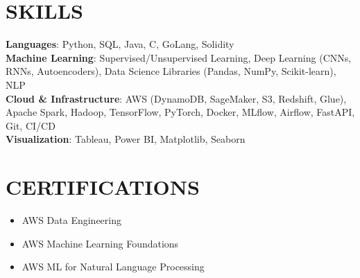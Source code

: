 \documentclass[letterpaper,10pt]{article}
\newcommand{\resumeItem}[1]{\item\small{{#1 \vspace{-2pt}}}}
\newcommand{\resumeSubHeadingListStart}{\begin{itemize}[leftmargin=0.15in, label={}]}
\newcommand{\resumeSubHeadingListEnd}{\end{itemize}}
\begin{document}
\section{SKILLS}
\begin{itemize}[leftmargin=0.15in, label={}]
    \small{\item{
     \textbf{Languages}{: Python, SQL, Java, C, GoLang, Solidity} \\
     \textbf{Machine Learning}{: Supervised/Unsupervised Learning, Deep Learning (CNNs, RNNs, Autoencoders), Data Science Libraries (Pandas, NumPy, Scikit-learn), NLP} \\
     \textbf{Cloud \& Infrastructure}{: AWS (DynamoDB, SageMaker, S3, Redshift, Glue), Apache Spark, Hadoop, TensorFlow, PyTorch, Docker, MLflow, Airflow, FastAPI, Git, CI/CD} \\
     \textbf{Visualization}{: Tableau, Power BI, Matplotlib, Seaborn}
    }}
\end{itemize}

\section{CERTIFICATIONS}
\resumeSubHeadingListStart
\resumeItem{AWS Data Engineering}
\resumeItem{AWS Machine Learning Foundations}
\resumeItem{AWS ML for Natural Language Processing}

\resumeSubHeadingListEnd
\end{document}
